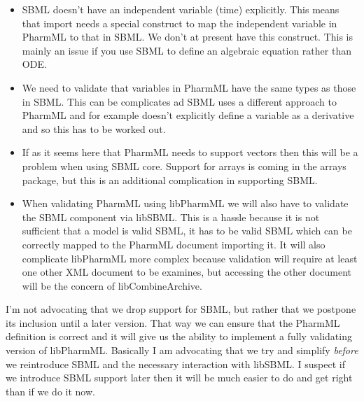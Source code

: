 \documentclass[a4paper,11pt]{article}
\newcommand{\pharmml}{PharmML\xspace}
\begin{document}
\begin{itemize}
\item SBML doesn't have an independent variable (time)
  explicitly. This means that import needs a special construct to map
  the independent variable in \pharmml to that in SBML. We don't at
  present have this construct. This is mainly an issue if you use SBML
  to define an algebraic equation rather than ODE.
\item We need to validate that variables in \pharmml have the same
  types as those in SBML. This can be complicates ad SBML uses a
  different approach to \pharmml and for example doesn't explicitly
  define a variable as a derivative and so this has to be worked out.
\item If as it seems here that \pharmml needs to support vectors then
  this will be a problem when using SBML core. Support for arrays is
  coming in the arrays package, but this is an additional complication
  in supporting SBML.
\item When validating \pharmml using libPharmML we will also have to
  validate the SBML component via libSBML. This is a hassle because it
  is not sufficient that a model is valid SBML, it has to be valid
  SBML which can be correctly mapped to the \pharmml document
  importing it. It will also complicate libPharmML more complex
  because validation will require at least one other XML document to
  be examines, but accessing the other document will be the concern of
  libCombineArchive.
\end{itemize}

I'm not advocating that we drop support for SBML, but rather that we
postpone its inclusion until a later version. That way we can ensure
that the \pharmml definition is correct and it will give us the
ability to implement a fully validating version of
libPharmML. Basically I am advocating that we try and simplify
\emph{before} we reintroduce SBML and the necessary interaction with
libSBML. I suspect if we introduce SBML support later then it will be
much easier to do and get right than if we do it now.
\end{document}
